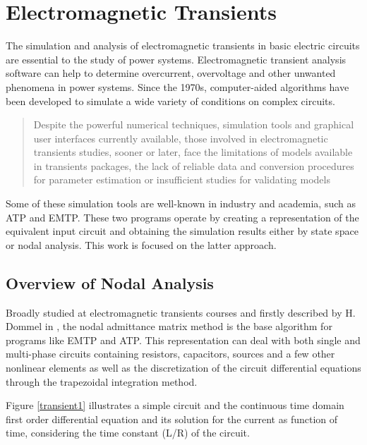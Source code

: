 \chapter{ Electromagnetic Transients }
\label{ch:etr}

The simulation and analysis of electromagnetic transients in basic electric circuits are essential to the study of power systems. Electromagnetic transient analysis software can help to determine overcurrent, overvoltage and other unwanted phenomena in power systems.  Since the 1970s, computer-aided algorithms have been developed to simulate a wide variety of conditions on complex circuits. 


\blockquote[\cite{martinez2015introduction}]{
Despite the powerful numerical techniques, simulation tools and graphical user interfaces currently
available, those involved in electromagnetic transients studies, sooner or later, face the limitations of
models available in transients packages, the lack of reliable data and conversion procedures for parameter
estimation or insufficient studies for validating models
}

Some of these simulation tools are well-known in industry and academia, such as ATP and EMTP. These two programs operate by creating a representation of the equivalent input circuit and obtaining the simulation results either by state space or nodal analysis. This work is focused on the latter approach.

\section{ Overview of Nodal Analysis }
\label{solutionalg}

Broadly studied at electromagnetic transients courses and firstly described by H. Dommel in \cite{dommel1969digital}, the nodal admittance matrix method is the base algorithm for programs like EMTP and ATP. This representation can deal with both single and multi-phase circuits containing resistors, capacitors, sources and a few other nonlinear elements as well as the discretization of the circuit differential equations through the trapezoidal integration method.


Figure \ref{transient1} illustrates a simple circuit and the continuous time domain first order differential equation and its solution for the current as function of time, considering the time constant (L/R) of the circuit.


